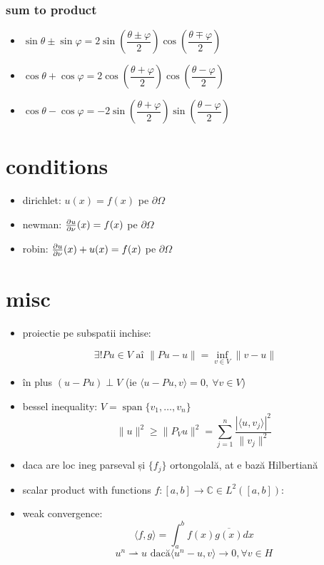 \documentclass[11pt]{article}
\begin{document}
\subsubsection*{sum to product}
\label{sec:org5edaa9f}
\begin{itemize}
\item \(\sin \theta \pm \sin \varphi = 2 \sin\left( \dfrac{\theta \pm \varphi}{2} \right) \cos\left( \dfrac{\theta \mp \varphi}{2} \right)\)
\item \(\cos \theta + \cos \varphi = 2 \cos\left( \dfrac{\theta + \varphi} {2} \right) \cos\left( \dfrac{\theta - \varphi}{2} \right)\)
\item \(\cos \theta - \cos \varphi = -2\sin\left( \dfrac{\theta + \varphi}{2}\right) \sin\left(\dfrac{\theta - \varphi}{2}\right)\)
\end{itemize}


\section*{conditions}
\label{sec:org0404746}
\begin{itemize}
\item dirichlet: \(u(x) = f(x)\) pe \(\partial \Omega\)
\item newman: \(\frac{\partial u}{\partial \nu}(x) = f(x)\) pe \(\partial \Omega\)
\item robin: \(\frac{\partial u}{\partial \nu}(x) +u(x) = f(x)\) pe \(\partial \Omega\)
\end{itemize}
\section*{misc}
\label{sec:orgba4fd7d}
\begin{itemize}
\item proiectie pe subspatii inchise:
\end{itemize}
\[ \exists ! Pu \in V  \text{ aî } \| P u - u \|  = \inf_{v \in V} \| v - u \| \]
\begin{itemize}
\item în plus \((u-Pu)\perp V\) (ie \(\langle u-Pu, v \rangle = 0,~ \forall v \in V\))
\end{itemize}
\begin{itemize}
\item bessel inequality: \(V = \operatorname{span} \{ v_1,\ldots, v_n \}\)
\[ \| u\|^2 \geq \|P_V u\|^2 = \sum_{j=1}^n \frac{|\langle u, v_j\rangle|^2}{\|v_j\|^2} \]
\item daca are loc ineg parseval și \(\{f_j\}\) ortongolală, at e bază Hilbertiană
\item scalar product with functions \(f: [a,b] \to \mathbb{C} \in L^2([a, b])\):
\item weak convergence:
\[ \langle f, g\rangle = \int_a^b f(x) \overline{g(x)} dx  \]
\[ u^n \rightharpoonup u \text{ dacă} \langle u^n-u, v\rangle \to 0, \forall v \in H \]
\end{itemize}
\end{document}
